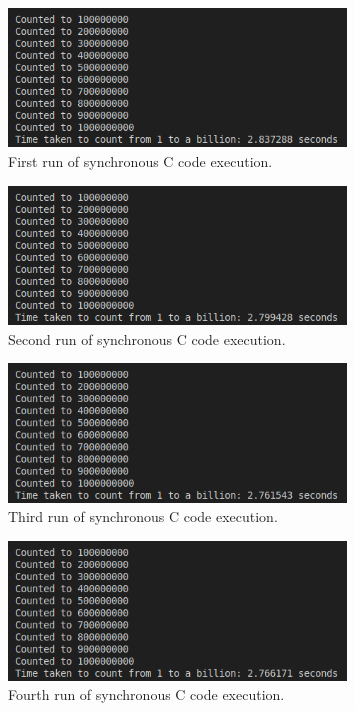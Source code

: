 \documentclass{article}
\begin{document}
\begin{figure}[htbp]
    \centering
    \includegraphics[width=0.8\textwidth]{../records/results_c/result_1.png}
    \caption{First run of synchronous C code execution.}
    \label{fig:C-runtime-1}
\end{figure}

\begin{figure}[htbp]
    \centering
    \includegraphics[width=0.8\textwidth]{../records/results_c/result_2.png}
    \caption{Second run of synchronous C code execution.}
    \label{fig:C-runtime-2}
\end{figure}

\begin{figure}[htbp]
    \centering
    \includegraphics[width=0.8\textwidth]{../records/results_c/result_3.png}
    \caption{Third run of synchronous C code execution.}
    \label{fig:C-runtime-3}
\end{figure}

\begin{figure}[htbp]
    \centering
    \includegraphics[width=0.8\textwidth]{../records/results_c/result_4.png}
    \caption{Fourth run of synchronous C code execution.}
    \label{fig:C-runtime-4}
\end{figure}
\end{document}
